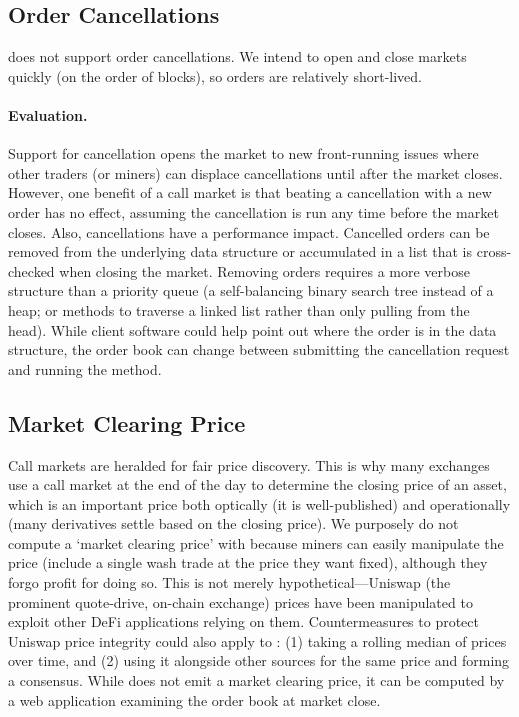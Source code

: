
\subsection{Order Cancellations}

\cm does not support order cancellations. We intend to open and close markets quickly (on the order of blocks), so orders are relatively short-lived.

\paragraph{Evaluation.} Support for cancellation opens the market to new front-running issues where other traders (or miners) can displace cancellations until after the market closes. However, one benefit of a call market is that beating a cancellation with a new order has no effect, assuming the cancellation is run any time before the market closes. Also, cancellations have a performance impact. Cancelled orders can be removed from the underlying data structure or accumulated in a list that is cross-checked when closing the market. Removing orders requires a more verbose structure than a priority queue (\eg a self-balancing binary search tree instead of a heap; or methods to traverse a linked list rather than only pulling from the head). While client software could help point out where the order is in the data structure, the order book can change between submitting the cancellation request and running the method. %


\subsection{Market Clearing Price}


Call markets are heralded for fair price discovery. This is why many exchanges use a call market at the end of the day to determine the closing price of an asset, which is an important price both optically (it is well-published) and operationally (many derivatives settle based on the closing price). We purposely do not compute a `market clearing price' with \cm because miners can easily manipulate the price (\ie include a single wash trade at the price they want fixed), although they forgo profit for doing so. This is not merely hypothetical---Uniswap (the prominent quote-drive, on-chain exchange) prices have been manipulated to exploit other DeFi applications relying on them. Countermeasures to protect Uniswap price integrity could also apply to \cm: (1) taking a rolling median of prices over time, and (2) using it alongside other sources for the same price and forming a consensus. While \cm does not emit a market clearing price, it can be computed by a web application examining the order book at market close.

